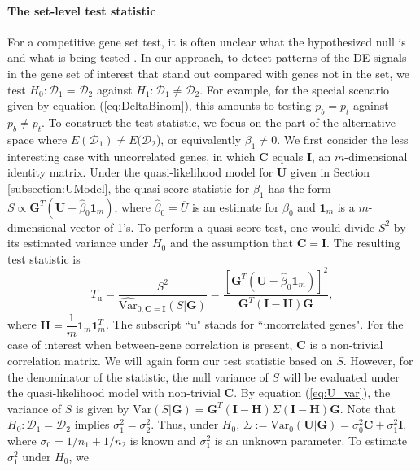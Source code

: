 	
	\paragraph{The set-level test statistic}\label{subsection:MEQL}
	For a competitive gene set test, it is often unclear what the hypothesized null is and what is
	being tested \citep{barry2008statistical,wu2012camera}. In our approach, to detect patterns of 
	the DE signals in the gene set of interest that stand out compared with genes not in the set, 
	we test $H_0: \mathscr{D}_1=\mathscr{D}_2$ against $H_1: \mathscr{D}_1\ne\mathscr{D}_2$. For 
	example, for the special scenario given by equation (\ref{eq:DeltaBinom}), this amounts to 
	testing $p_{b}=p_{t}$ against $p_{b}\ne p_{t}$.
	To construct the test statistic, we focus on the part of the alternative space where
	$E(\mathscr{D}_1)\ne E(\mathscr{D}_2$), or equivalently $\beta_1\ne 0$. We first consider the 
	less
	interesting case with uncorrelated genes, in which $\bm C$ equals $\bm I$, an $m$-dimensional
	identity matrix. Under the quasi-likelihood model for $\bm U$ given in Section
	\ref{subsection:UModel},  the quasi-score statistic for $\beta_1$ has the form $S \propto \bm
	G^T(\bm U-\hat\beta_0\bm 1_m)$, where $\hat\beta_0=\overline{U}$ is an estimate for $\beta_0$ 
	and
	$\bm 1_m$ is a $m$-dimensional vector of 1's. To perform a quasi-score test, one would divide 
	$S^2$
	by its estimated variance under $H_0$ and the assumption that $\bm C=\bm I$. The resulting test
	statistic is 
	\begin{equation}
	T_{\text{u}} = \dfrac{S^2}{\widehat{\mbox{Var}}_{0, \bm C=\bm I}(S|\bm G)} = \dfrac{[\bm G^T(\bm
		U-\hat\beta_0\bm 1_m)]^2}{\bm G^T(\bm I-\bm H)\bm G}, 
	\end{equation}
	where $\bm H = \dfrac{1}{m}\bm 1_m\bm 1_m^T$. The subscript ``u" stands for ``uncorrelated 
	genes".
	For the case of interest when between-gene correlation is present, $\bm C$ is a non-trivial
	correlation matrix. We will again form our test statistic based on $S$. However, for the
	denominator of the statistic, the null variance of $S$ will be evaluated under the 
	quasi-likelihood
	model with non-trivial $\bm C$. By equation (\ref{eq:U_var}), the variance of $S$ is given by
	$\mbox{Var}(S|\bm G) = \bm G^T(\bm I-\bm H)\Sigma(\bm I-\bm H)\bm G$. Note that $H_0:
	\mathscr{D}_1=\mathscr{D}_2$ implies $\sigma_1^2=\sigma_2^2$. Thus, under $H_0$,
	$\Sigma:=\mbox{Var}_{0}(\bm U|\bm G)=\sigma_0^2\bm C+\sigma_1^2\bm I$, where 
	$\sigma_0=1/n_1+1/n_2$
	is known and $\sigma_1^2$ is an unknown parameter. To estimate $\sigma_1^2$ under $H_0$, we 
